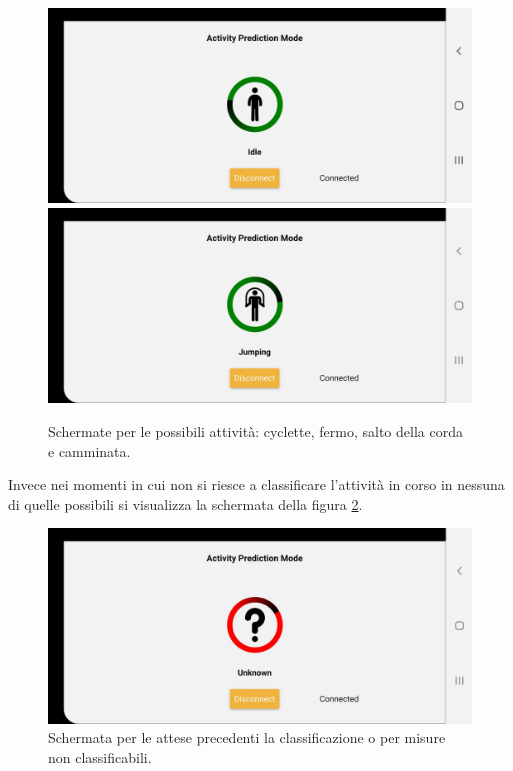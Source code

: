 \begin{figure}[tbh]
	\centering
	\includegraphics[width=0.4\linewidth]{./ImageFiles/idle}
	\includegraphics[width=0.4\linewidth]{./ImageFiles/jumping}
	\caption{Schermate per le possibili attività: cyclette, fermo, salto della corda e camminata.}
	\label{fig:attivitafisica}
\end{figure}

Invece nei momenti in cui non si riesce a classificare l'attività in corso in nessuna di quelle possibili si visualizza la schermata della figura \ref{fig:attesa}.

\begin{figure}[tbh]
	\centering
	\includegraphics[width=0.4\linewidth]{./ImageFiles/unknown}
	\caption{Schermata per le attese precedenti la classificazione o per misure non classificabili.}
	\label{fig:attesa}
\end{figure}

